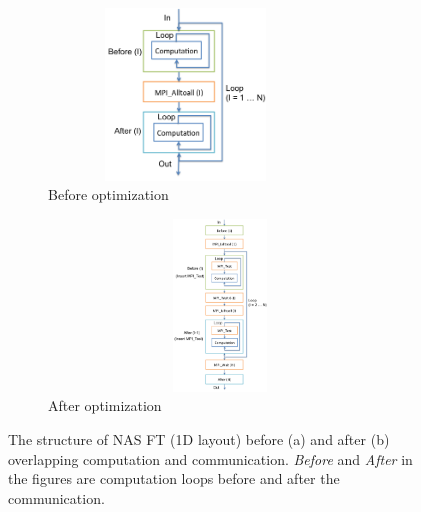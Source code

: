 \begin{figure}
  \centering
  \begin{subfigure}[b]{0.2\textwidth}
    \includegraphics[width=0.8\textwidth,height=1.8in]{fig/ft_loop.png}
    \caption{Before optimization}
    \label{fig:ft_loop}
  \end{subfigure}%
  \hspace{-.3in}
  \begin{subfigure}[b]{0.3\textwidth}
    \includegraphics[width=1.1\textwidth,height=1.8in]{fig/ft_cco.png}
    \caption{After optimization}
    \label{fig:ft_cco}
  \end{subfigure}
  \caption{The structure of NAS FT (1D layout) before (a) and after (b) overlapping computation and communication.
           \emph{Before} and \emph{After} in the figures are computation loops before and after the communication.}
\label{fig:ft}
\end{figure}

